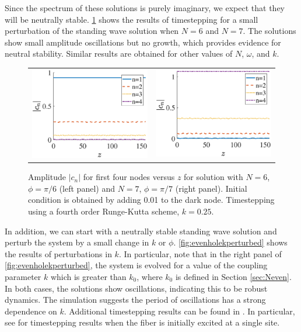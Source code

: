 \documentclass[12pt,reqno]{amsart}
\begin{document}
Since the spectrum of these solutions is purely imaginary, we expect that they will be neutrally stable.  \cref{fig:evenhole6perturbed} shows the results of timestepping for a small perturbation of the standing wave solution when $N=6$ and $N=7$. The solutions show small amplitude oscillations but no growth, which provides evidence for neutral stability. Similar results are obtained for other values of $N$, $\omega$, and $k$.
\begin{figure}[H]
\begin{center}
\begin{tabular}{cc}
\includegraphics[width=7.5cm]{images/evenhole6perturbed.eps} & 
\includegraphics[width=7.5cm]{images/oddhole7perturbed.eps}
\end{tabular}
\end{center}
\caption{Amplitude $|c_n|$ for first four nodes versus $z$ for solution with $N=6$,  $\phi = \pi/6$ (left panel) and $N=7$, $\phi = \pi/7$ (right panel). Initial condition is obtained by adding 0.01 to the dark node. Timestepping using a fourth order Runge-Kutta scheme, $k=0.25$.}
\label{fig:evenhole6perturbed}
\end{figure}
In addition, we can start with a neutrally stable standing wave solution and perturb the system by a small change in $k$ or $\phi$. \cref{fig:evenholekperturbed} shows the results of perturbations in $k$. In particular, note that in the right panel of \cref{fig:evenholekperturbed}, the system is evolved for a value of the coupling parameter $k$ which is greater than $k_0$, where $k_0$ is defined in Section \ref{sec:Neven}. In both cases, the solutions show oscillations, indicating this to be robust dynamics. The simulation suggests the period of oscillations has a strong dependence on $k$. Additional timestepping results can be found in \cite{castro2016}. In particular, see \cite[Figure 4]{castro2016} for timestepping results when the fiber is initially excited at a single site. 
\end{document}
